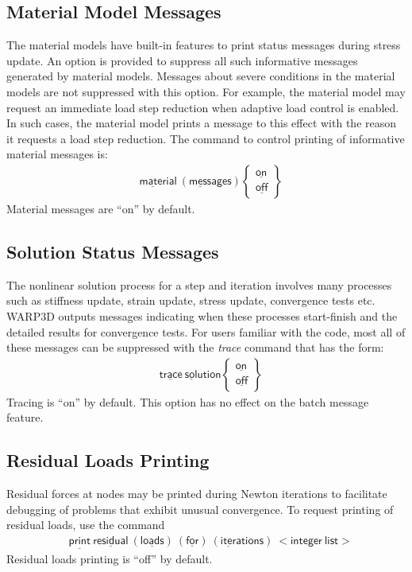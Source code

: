 \documentclass[11pt]{report}
\numberwithin{equation}{section}
\newcommand{\nin} {\noindent}
\newcommand{\ul} {\underline}
\newcommand{\hv} {\mathsf}   %
\newcommand{\ti}{\emph}
\begin{document}
\subsection{Material Model Messages}
\nin The material models have built-in features to print status messages during stress update. 
An option is provided to suppress all such informative messages generated by material models. 
Messages about severe conditions in the material models are not suppressed with this 
option. For example, the material model may request an immediate load step reduction 
when adaptive load control is enabled. In such cases, the material model prints a message 
to this effect with the reason it requests a load step reduction. 
The command to control printing of informative material messages is:
\begin{align*}
&\hv{\ul{mater}ial\  (\ul{mess}ages)  }
\begin{Bmatrix}
\hv{\ul{on} }\\ \hv{\ul{off}}
\end{Bmatrix}
\end{align*}
\nin Material messages are ``on'' by default.

\subsection{Solution Status Messages}
\nin The nonlinear solution process for a step and iteration involves many processes such as 
stiffness update, strain update, stress update, convergence tests etc. WARP3D outputs 
messages indicating when these processes start-finish and the detailed results 
for convergence tests. For users familiar with the code, most all of these 
messages can be suppressed with the \ti{trace} command that has the form:
\begin{align*}
&\hv{\ul{trace}\  \ul{sol}ution  }
\begin{Bmatrix}
\hv{\ul{on} }\\ \hv{\ul{off}}
\end{Bmatrix}
\end{align*}
\nin Tracing is ``on'' by default. This option has no effect on 
the batch message feature.

\subsection{Residual Loads Printing}
\nin Residual forces at nodes may be printed during Newton iterations to facilitate debugging 
of problems that exhibit unusual convergence. To request printing of residual loads, 
use the command
\begin{align*}
&\hv{\ul{print}\  \ul{residual}\  (\ul{loads})\  (\ul{for}) \  (\ul{iter}ations)\  <integer\ list>  }
\end{align*}
\nin Residual loads printing is ``off'' by default.
\end{document}
